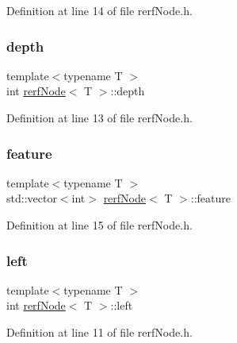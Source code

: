 Definition at line 14 of file rerf\+Node.\+h.

\mbox{\label{classrerfNode_a85845e08b7db33d241ddc3ff6b63799f}} 
\subsubsection{\texorpdfstring{depth}{depth}}
{\footnotesize\ttfamily template$<$typename T $>$ \\
int \hyperlink{classrerfNode}{rerf\+Node}$<$ T $>$\+::depth\hspace{0.3cm}{\ttfamily [protected]}}



Definition at line 13 of file rerf\+Node.\+h.

\mbox{\label{classrerfNode_af41edc70aae781312c3b20311430a89a}} 
\subsubsection{\texorpdfstring{feature}{feature}}
{\footnotesize\ttfamily template$<$typename T $>$ \\
std\+::vector$<$int$>$ \hyperlink{classrerfNode}{rerf\+Node}$<$ T $>$\+::feature\hspace{0.3cm}{\ttfamily [protected]}}



Definition at line 15 of file rerf\+Node.\+h.

\mbox{\label{classrerfNode_a0ffbd4e13914bfdd0d35e2e737b0a959}} 
\subsubsection{\texorpdfstring{left}{left}}
{\footnotesize\ttfamily template$<$typename T $>$ \\
int \hyperlink{classrerfNode}{rerf\+Node}$<$ T $>$\+::left\hspace{0.3cm}{\ttfamily [protected]}}



Definition at line 11 of file rerf\+Node.\+h.

\mbox{\label{classrerfNode_ae04521c833fe33f2b1cde19bb3cb615f}} 

